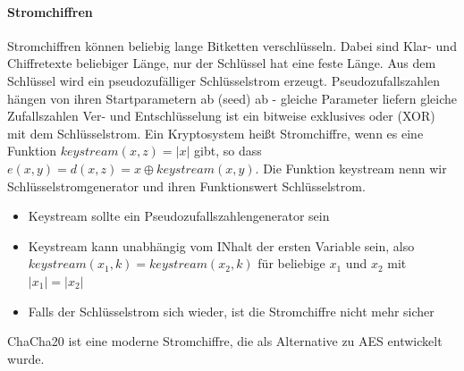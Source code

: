 \documentclass[
../../css_summary.tex,
]
{subfiles}
\begin{document}
\paragraph{Stromchiffren}
Stromchiffren können beliebig lange Bitketten verschlüsseln. Dabei sind Klar- und Chiffretexte beliebiger Länge, nur der Schlüssel hat eine feste Länge. Aus dem Schlüssel wird ein pseudozufälliger Schlüsselstrom erzeugt. Pseudozufallszahlen hängen von ihren Startparametern ab (seed) ab - gleiche Parameter liefern gleiche Zufallszahlen Ver- und Entschlüsselung ist ein bitweise exklusives oder (XOR) mit dem Schlüsselstrom.
Ein Kryptosystem heißt Stromchiffre, wenn es eine Funktion $keystream(x,z) = \lvert x \rvert$ gibt, so dass $e(x,y) = d(x,z) = x \oplus keystream(x,y)$.
Die Funktion keystream nenn wir Schlüsselstromgenerator und ihren Funktionswert Schlüsselstrom.
\begin{itemize}
   \item Keystream sollte ein Pseudozufallszahlengenerator sein
   \item Keystream kann unabhängig vom INhalt der ersten Variable sein, also $keystream(x_1,k) = keystream(x_2,k)$ für beliebige $x_1$ und $x_2$ mit $\lvert x_1 \rvert = \lvert x_2 \rvert$
   \item Falls der Schlüsselstrom sich wieder, ist die Stromchiffre nicht mehr sicher
\end{itemize}
ChaCha20 ist eine moderne Stromchiffre, die als Alternative zu AES entwickelt wurde.
\end{document}
